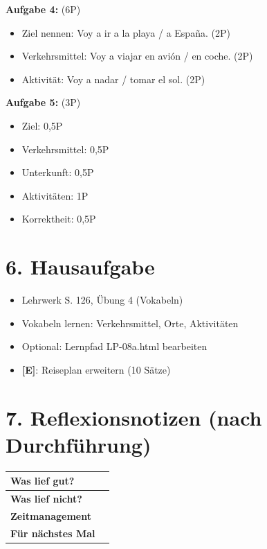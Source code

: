 \documentclass[11pt, a4paper]{article}
\newcommand{\E}{\textcolor{erweiterung}{\textbf{[E]}}}
\begin{document}
\textbf{Aufgabe 4:} (6P)
\begin{itemize}
    \item Ziel nennen: Voy a ir a la playa / a España. (2P)
    \item Verkehrsmittel: Voy a viajar en avión / en coche. (2P)
    \item Aktivität: Voy a nadar / tomar el sol. (2P)
\end{itemize}

\textbf{Aufgabe 5:} (3P)
\begin{itemize}
    \item Ziel: 0,5P
    \item Verkehrsmittel: 0,5P
    \item Unterkunft: 0,5P
    \item Aktivitäten: 1P
    \item Korrektheit: 0,5P
\end{itemize}


\section*{6. Hausaufgabe}

\begin{itemize}
    \item Lehrwerk S. 126, Übung 4 (Vokabeln)
    \item Vokabeln lernen: Verkehrsmittel, Orte, Aktivitäten
    \item Optional: Lernpfad LP-08a.html bearbeiten
    \item \E{}: Reiseplan erweitern (10 Sätze)
\end{itemize}


\section*{7. Reflexionsnotizen (nach Durchführung)}

\begin{tabularx}{\textwidth}{|l|X|}
\hline
\textbf{Was lief gut?} & \\[2em]
\hline
\textbf{Was lief nicht?} & \\[2em]
\hline
\textbf{Zeitmanagement} & \\[2em]
\hline
\textbf{Für nächstes Mal} & \\[2em]
\hline
\end{tabularx}
\end{document}
